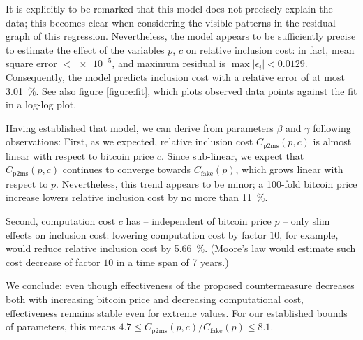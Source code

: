 \documentclass[a4paper,11pt,titlepage]{scrbook}
\begin{document}
It is explicitly to be remarked that this model does not precisely explain the data; this becomes clear when considering the visible patterns in the residual graph of this regression.
Nevertheless, the model appears to be sufficiently precise to estimate the effect of the variables $p$, $c$ on relative inclusion cost: in fact, mean square error $< \num{e-5}$, and maximum residual is $\max |\epsilon_i| < 0.0129$. Consequently, the model predicts inclusion cost with a relative error of at most \SI{3.01}{\percent}.
See also figure \ref{figure:fit}, which plots observed data points against the fit in a log-log plot.

Having established that model, we can derive from parameters $\beta$ and $\gamma$ following observations:
First, as we expected, relative inclusion cost $C_\mathrm{p2ms}(p,c)$ is almost linear with respect to bitcoin price $c$.
Since sub-linear, we expect that $C_\mathrm{p2ms}(p,c)$ continues to converge towards $C_\mathrm{fake}(p)$, which grows linear with respect to $p$.
Nevertheless, this trend appears to be minor; a 100-fold bitcoin price increase lowers relative inclusion cost by no more than \SI{11}{\percent}.

Second, computation cost $c$ has – independent of bitcoin price $p$ – only slim effects on inclusion cost: lowering computation cost by factor $10$, for example, would reduce relative inclusion cost by \SI{5.66}{\percent}. (Moore's law would estimate such cost decrease of factor $10$ in a time span of 7 years.)

We conclude: even though effectiveness of the proposed countermeasure decreases both with increasing bitcoin price and decreasing computational cost, effectiveness remains stable even for extreme values.
For our established bounds of parameters, this means $\num{4.7} \leq C_\mathrm{p2ms}(p,c) / C_\mathrm{fake}(p) \leq \num{8.1}$.
\end{document}

